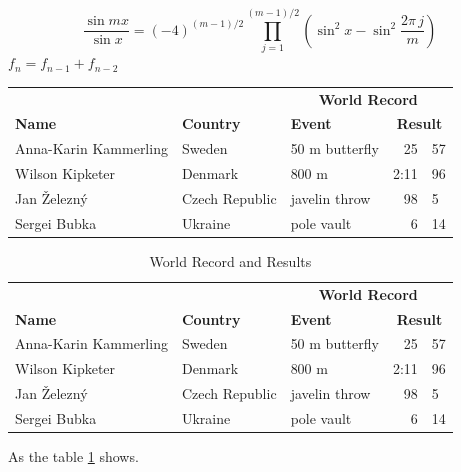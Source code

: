 \documentclass{article}
\begin{document}
\begin{equation*}
\frac {\sin mx}{\sin x} = (-4)^{{(m-1)}/{2}}\prod_{j=1}^{{(m-1)}/{2}}(\sin^{2}x - \sin^{2}\frac{2\pi \, j}{m})
\end{equation*}
$f_{n} = f_{n-1} + f_{n-2}$ 


\break

\begin{tabular}{l l l r@{.}l}
\hline 
& & \multicolumn{3}{c}{\textbf{World Record}} \\ 
\cline{3-5}
\bfseries{Name} & \bfseries{Country} & \bfseries{Event} & \multicolumn{2}{c}{\bfseries{Result}}				 \\ 
\hline Anna-Karin Kammerling & Sweden & 50 m butterfly & 25&57 \\ 
Wilson Kipketer & Denmark & 800 m & 2:11&96 \\ 
Jan 
\v{Z}elezný & Czech Republic & javelin throw & 98&5 \\ 
Sergei Bubka & Ukraine & pole vault & 6&14 \\ 
\hline 
\end{tabular}  

\begin{table}[htbp]
\centering
\begin{tabular}{l l l r@{.}l}
\hline 
& & \multicolumn{3}{c}{\textbf{World Record}} \\ 
\cline{3-5}
\bfseries{Name} & \bfseries{Country} & \bfseries{Event} & \multicolumn{2}{c}{\bfseries{Result}}				 \\ 
\hline Anna-Karin Kammerling & Sweden & 50 m butterfly & 25&57 \\ 
Wilson Kipketer & Denmark & 800 m & 2:11&96 \\ 
Jan 
\v{Z}elezný & Czech Republic & javelin throw & 98&5 \\ 
Sergei Bubka & Ukraine & pole vault & 6&14 \\ 
\hline 
\end{tabular}  
\caption{World Record and Results} 
\label{Table 1} 
\end{table} 

As the table \ref{Table 1} shows.

\break

\begin{center}
\end{center}
\end{document}
